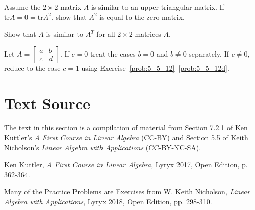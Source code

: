 \documentclass{ximera}
\begin{document}
\begin{problem}
Assume the $2 \times 2$ matrix $A$ is similar to an upper triangular matrix. If $\mbox{tr} A = 0 = \mbox{tr} A^{2}$, show that $A^{2}$ is equal to the zero matrix.
\end{problem}

\begin{problem}
Show that $A$ is similar to $A^{T}$ for all $2 \times 2$ matrices $A$. 
\begin{hint}
Let $A =\begin{bmatrix}
a & b \\
c & d
\end{bmatrix}$. If $c = 0$ treat the cases $b = 0$ and $b \neq 0$ separately. If $c \neq 0$, reduce to the case $c = 1$ using Exercise~\ref{prob:5_5_12}~\ref{prob:5_5_12d}.
\end{hint}
\end{problem}

\section*{Text Source}
The text in this section is a compilation of material from Section 7.2.1 of Ken Kuttler's \href{https://open.umn.edu/opentextbooks/textbooks/a-first-course-in-linear-algebra-2017}{\it A First Course in Linear Algebra} (CC-BY) and Section 5.5 of Keith Nicholson's \href{https://open.umn.edu/opentextbooks/textbooks/linear-algebra-with-applications}{\it Linear Algebra with Applications} (CC-BY-NC-SA).

Ken Kuttler, {\it  A First Course in Linear Algebra}, Lyryx 2017, Open Edition, p. 362-364.

Many of the Practice Problems are Exercises from 
W. Keith Nicholson, {\it Linear Algebra with Applications}, Lyryx 2018, Open Edition, pp. 298-310.
\end{document}
